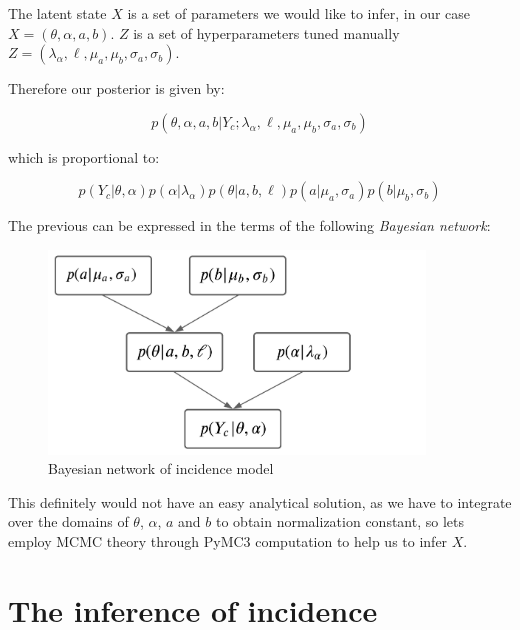 \documentclass[
  digital, %
  oneside, %
  lof,     %
  lot,     %
]{fithesis4}
\begin{document}
The latent state $X$ is a set of parameters we would like to infer, in our case $X = (\theta, \alpha, a, b)$.
$Z$ is a set of hyperparameters tuned manually $Z = (\lambda_\alpha, \ell, \mu_a, \mu_b, \sigma_a, \sigma_b)$.

Therefore our posterior is given by:

\begin{equation}
  p \left( \theta, \alpha, a, b | Y_c; \lambda_\alpha, \ell, \mu_a, \mu_b, \sigma_a, \sigma_b \right)
\end{equation}

which is proportional to:

\begin{equation}\label{eq:inc-model-joint-expanded}
   p( Y_c | \theta, \alpha ) p( \alpha | \lambda_\alpha ) p ( \theta | a, b, \ell ) p ( a | \mu_a, \sigma_a ) p ( b | \mu_b, \sigma_b )
\end{equation}

The previous can be expressed in the terms of the following \textit{Bayesian network}:

\begin{figure}[H]
  \begin{center}
    \includegraphics[width=10cm]{static/images/bayesian-network.png}
  \end{center}
  \caption{Bayesian network of incidence model}
  \label{fig:inc-model-bayesian-network}
\end{figure}

This definitely would not have an easy analytical solution, as we have to integrate over the domains of $\theta$, $\alpha$, $a$ and $b$ to obtain normalization constant, so lets employ MCMC theory through PyMC3 computation to help us to infer $X$.


\section{The inference of incidence}
\label{sec:inference-of-incidence}
\end{document}
